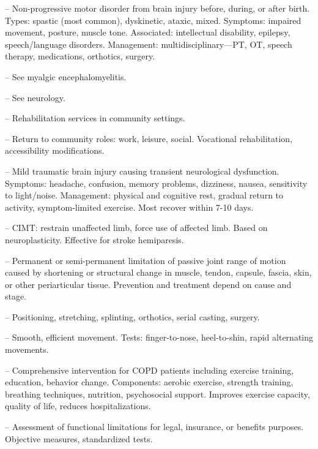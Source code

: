 -- Non-progressive motor disorder from brain injury before, during, or after birth. Types: spastic (most common), dyskinetic, ataxic, mixed. Symptoms: impaired movement, posture, muscle tone. Associated: intellectual disability, epilepsy, speech/language disorders. Management: multidisciplinary—PT, OT, speech therapy, medications, orthotics, surgery.

-- See myalgic encephalomyelitis.

-- See neurology.

-- Rehabilitation services in community settings.

-- Return to community roles: work, leisure, social. Vocational rehabilitation, accessibility modifications.

-- Mild traumatic brain injury causing transient neurological dysfunction. Symptoms: headache, confusion, memory problems, dizziness, nausea, sensitivity to light/noise. Management: physical and cognitive rest, gradual return to activity, symptom-limited exercise. Most recover within 7-10 days.

-- CIMT: restrain unaffected limb, force use of affected limb. Based on neuroplasticity. Effective for stroke hemiparesis.

-- Permanent or semi-permanent limitation of passive joint range of motion caused by shortening or structural change in muscle, tendon, capsule, fascia, skin, or other periarticular tissue. Prevention and treatment depend on cause and stage.

-- Positioning, stretching, splinting, orthotics, serial casting, surgery.


-- Smooth, efficient movement. Tests: finger-to-nose, heel-to-shin, rapid alternating movements.


-- Comprehensive intervention for COPD patients including exercise training, education, behavior change. Components: aerobic exercise, strength training, breathing techniques, nutrition, psychosocial support. Improves exercise capacity, quality of life, reduces hospitalizations.

-- Assessment of functional limitations for legal, insurance, or benefits purposes. Objective measures, standardized tests.

